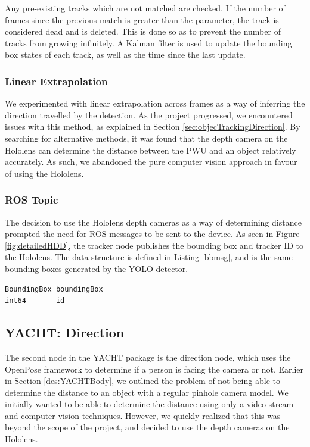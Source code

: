 Any pre-existing tracks which are not matched are checked. If the number of frames since the previous match is greater than the  parameter, the track is considered dead and is deleted. This is done so as to prevent the number of tracks from growing infinitely. A Kalman filter is used to update the bounding box states of each track, as well as the time since the last update.
 
\subsubsection{Linear Extrapolation}
We experimented with linear extrapolation across frames as a way of inferring the direction travelled by the detection. As the project progressed, we encountered issues with this method, as explained in Section \ref{sec:objecTrackingDirection}. By searching for alternative methods, it was found that the depth camera on the Hololens can determine the distance between the PWU and an object relatively accurately. As such, we abandoned the pure computer vision approach in favour of using the Hololens.

\subsubsection{ROS Topic} The decision to use the Hololens depth cameras as a way of determining distance prompted the need for ROS messages to be sent to the device. As seen in Figure \ref{fig:detailedHDD}, the  tracker node publishes the bounding box and tracker ID to the Hololens. The  data structure is defined in Listing \ref{bbmsg}, and is the same bounding boxes generated by the YOLO detector.

\begin{lstlisting}[language=Mymatlab,caption={ROS message structure for BoundingBoxID.msg}]
BoundingBox boundingBox
int64       id
\end{lstlisting}

\subsection{YACHT: Direction}
The second node in the YACHT package is the direction node, which uses the OpenPose framework to determine if a person is facing the camera or not. Earlier in Section \ref{des:YACHTBody}, we outlined the problem of not being able to determine the distance to an object with a regular pinhole camera model. We initially wanted to be able to determine the distance using only a video stream and computer vision techniques. However, we quickly realized that this was beyond the scope of the project, and decided to use the depth cameras on the Hololens.

